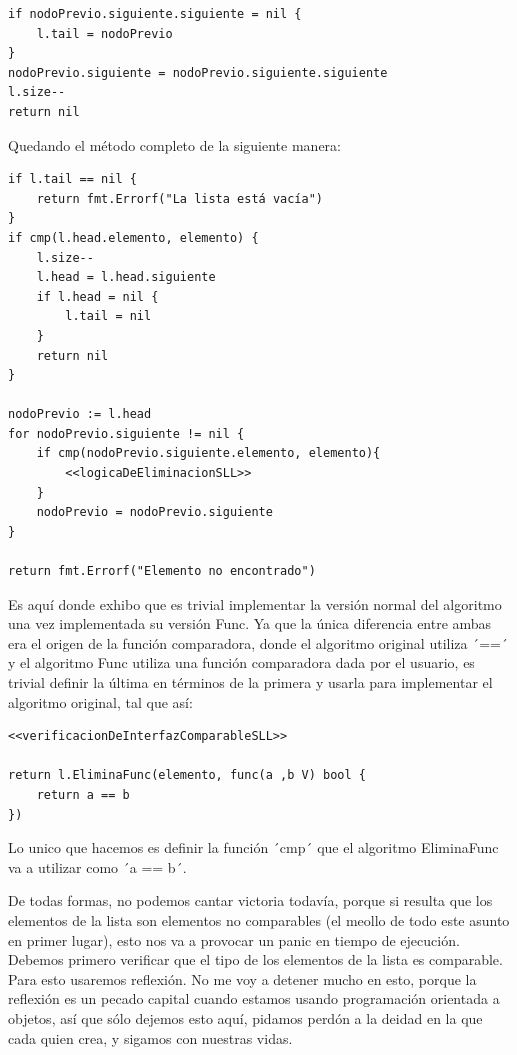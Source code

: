\documentclass[11pt]{article}
\begin{document}
\begin{enumerate}
\begin{verbatim}
if nodoPrevio.siguiente.siguiente = nil {
	l.tail = nodoPrevio
}
nodoPrevio.siguiente = nodoPrevio.siguiente.siguiente
l.size--
return nil
\end{verbatim}

Quedando el método completo de la siguiente manera:

\begin{verbatim}
if l.tail == nil {
	return fmt.Errorf("La lista está vacía")
}
if cmp(l.head.elemento, elemento) {
	l.size--
	l.head = l.head.siguiente
	if l.head = nil {
		l.tail = nil
	}
	return nil
}

nodoPrevio := l.head
for nodoPrevio.siguiente != nil {
	if cmp(nodoPrevio.siguiente.elemento, elemento){
		<<logicaDeEliminacionSLL>>
	}
	nodoPrevio = nodoPrevio.siguiente
}

return fmt.Errorf("Elemento no encontrado")

\end{verbatim}

Es aquí donde exhibo que es trivial implementar la versión normal del algoritmo una vez implementada su versión Func. Ya que la única diferencia entre ambas era el origen de la función comparadora, donde el algoritmo original utiliza ´==´ y el algoritmo Func utiliza una función comparadora dada por el usuario, es trivial definir la última en términos de la primera y usarla para implementar el algoritmo original, tal que así:

\begin{verbatim}
<<verificacionDeInterfazComparableSLL>>

return l.EliminaFunc(elemento, func(a ,b V) bool {
	return a == b
})
\end{verbatim}

Lo unico que hacemos es definir la función ´cmp´ que el algoritmo EliminaFunc va a utilizar como ´a == b´.

De todas formas, no podemos cantar victoria todavía, porque si resulta que los elementos de la lista son elementos no comparables (el meollo de todo este asunto en primer lugar), esto nos va a provocar un panic en tiempo de ejecución. Debemos primero verificar que el tipo de los elementos de la lista es comparable. Para esto usaremos reflexión. No me voy a detener mucho en esto, porque la reflexión es un pecado capital cuando estamos usando programación orientada a objetos, así que sólo dejemos esto aquí, pidamos perdón a la deidad en la que cada quien crea, y sigamos con nuestras vidas.


\end{enumerate}
\end{document}
